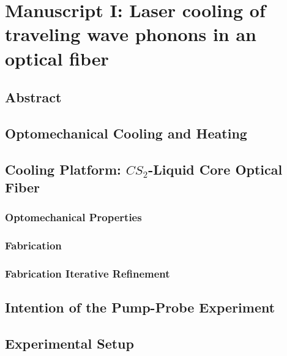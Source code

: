 \setcounter{rownumber}{0}
\chapter{Manuscript I: Laser cooling of traveling wave phonons in an optical fiber}
\label{ch:Cooling}
\acresetall

\section{Abstract}
\label{sec:Cooling:Abstract}
\lipsum[1]

\section{Optomechanical Cooling and Heating}
\label{sec:Cooling:Cooling-Heating}
\lipsum[1]

\section{Cooling Platform: \texorpdfstring{$CS_{2}$}{CS2}-Liquid Core Optical Fiber}
\label{sec:Cooling:Platform}
\lipsum[1]

  \subsection{Optomechanical Properties}
  \label{subsec:Cooling:Platform:Properties}
  \lipsum[1]

  \subsection{Fabrication}
  \label{subsec:Cooling:Platform:Fabrication}
  \lipsum[1]

  \subsection{Fabrication Iterative Refinement}
  \label{subsec:Cooling:Platform:Refinement}
  \lipsum[1]

\section{Intention of the Pump-Probe Experiment}
\label{sec:Cooling:Intention}
\lipsum[1]

\section{Experimental Setup}
\label{sec:Cooling:Setup}
\lipsum[1]

